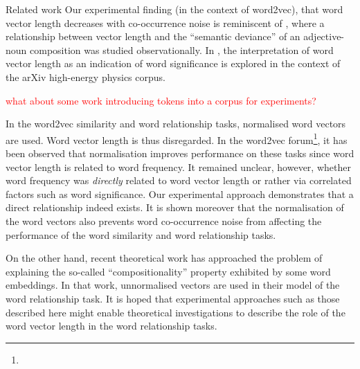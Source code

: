 \documentclass{article} %
\begin{document}
\begin{section}{Related work}\label{related-work}
Our experimental finding (in the context of word2vec), that word vector length decreases with co-occurrence noise is reminiscent of \cite{vecchi-baroni-zamparelli2011}, where a relationship between vector length and the ``semantic deviance'' of an adjective-noun composition was studied observationally.
In \cite{schakel-wilson}, the interpretation of word vector length as an indication of word significance is explored in the context of the arXiv high-energy physics corpus.

\textcolor{red}{what about some work introducing tokens into a corpus for experiments?}

In the word2vec similarity and word relationship tasks, normalised word vectors are used.
Word vector length is thus disregarded.
In the word2vec forum\footnote{\googlegroup}, it has been observed that normalisation improves performance on these tasks since word vector length is related to word frequency.
It remained unclear, however, whether word frequency was \textit{directly} related to word vector length or rather via correlated factors such as word significance.
Our experimental approach demonstrates that a direct relationship indeed exists.
It is shown moreover that the normalisation of the word vectors also prevents word co-occurrence noise from affecting the performance of the word similarity and word relationship tasks.

On the other hand, recent theoretical work \cite{Arora2015} has approached the problem of explaining the so-called ``compositionality'' property exhibited by some word embeddings.
In that work, unnormalised vectors are used in their model of the word relationship task.
It is hoped that experimental approaches such as those described here might enable theoretical investigations to describe the role of the word vector length in the word relationship tasks.
\end{section}
\end{document}
